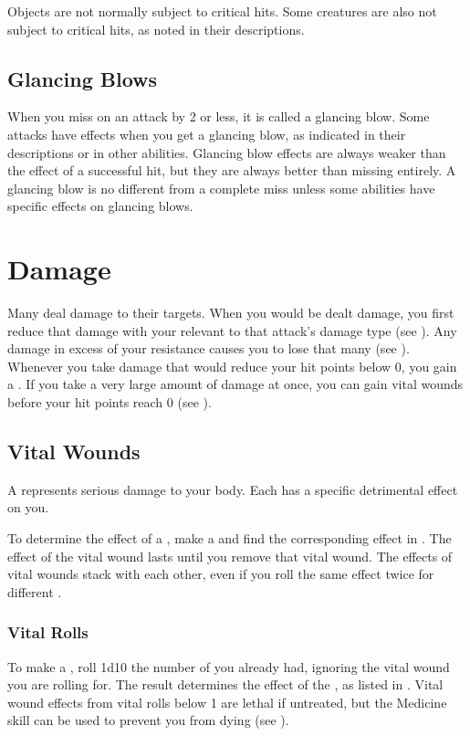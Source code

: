         Objects are not normally subject to critical hits.
        Some creatures are also not subject to critical hits, as noted in their descriptions.

    \subsection{Glancing Blows}\label{Glancing Blows}
        When you miss on an attack by 2 or less, it is called a glancing blow.
        Some attacks have effects when you get a glancing blow, as indicated in their descriptions or in other abilities.
        Glancing blow effects are always weaker than the effect of a successful hit, but they are always better than missing entirely.
        A glancing blow is no different from a complete miss unless some abilities have specific effects on glancing blows.

\section{Damage}\label{Damage}
    Many  deal damage to their targets.
    When you would be dealt damage, you first reduce that damage with your relevant  to that attack's damage type (see ).
    Any damage in excess of your resistance causes you to lose that many  (see ).
    Whenever you take damage that would reduce your hit points below 0, you gain a .
    If you take a very large amount of damage at once, you can gain vital wounds before your hit points reach 0 (see ).

    \subsection{Vital Wounds}\label{Vital Wounds}
        A  represents serious damage to your body.
        Each  has a specific detrimental effect on you.

        To determine the effect of a , make a  and find the corresponding effect in .
        The effect of the vital wound lasts until you remove that vital wound.
        The effects of vital wounds stack with each other, even if you roll the same effect twice for different .

        \subsubsection{Vital Rolls}\label{Vital Rolls}
            To make a , roll 1d10 \sub the number of  you already had, ignoring the vital wound you are rolling for.
            The result determines the effect of the , as listed in .
            Vital wound effects from vital rolls below 1 are lethal if untreated, but the Medicine skill can be used to prevent you from dying (see ).

